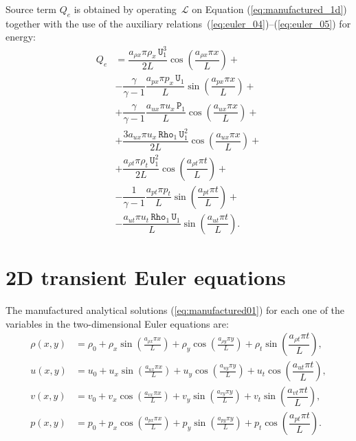\documentclass[10pt]{article}
\newcommand{\Rho}{\,\mathtt{Rho}}
\newcommand{\PP}{\,\mathtt{P}}
\newcommand{\U}{\,\mathtt{U}}
\newcommand{\Lo}{\,\mathcal{L}}
\begin{document}
Source term $Q_e$ is obtained by operating $\Lo$ on Equation  (\ref{eq:manufactured_1d}) together with the use of the  auxiliary relations~(\ref{eq:euler_04})--(\ref{eq:euler_05}) for energy:
  \begin{equation}\label{eq:source_e}
 \begin{split}
Q_e &= \dfrac{a_{\rho x} \pi \rho_x \U_1^3 }{2L}\cos\left(\dfrac{a_{\rho x} \pi x}{L}\right)+\\
&- \dfrac{\gamma}{\gamma-1}\dfrac{a_{px} \pi p_x \U_1}{L}\sin\left(\dfrac{a_{px} \pi x}{L}\right) +\\
&+ \dfrac{\gamma}{\gamma-1}\dfrac{a_{ux} \pi u_x \PP_1}{L}\cos\left(\dfrac{a_{ux} \pi x}{L}\right)  +\\
&+ \dfrac{ 3 a_{ux} \pi u_x \Rho_1 \U_1^2 }{2L}\cos\left(\dfrac{a_{ux} \pi x}{L}\right)+\\
&+   \dfrac{a_{\rho t} \pi \rho_t \U_1^2}{2L}\cos\left(\dfrac{a_{\rho t} \pi t}{L}\right)+\\
&- \dfrac{1}{\gamma-1}\dfrac{a_{pt} \pi p_t}{L}\sin\left(\dfrac{a_{pt} \pi t}{L}\right)+\\
&-\dfrac{ a_{ut} \pi u_t \Rho_1 \U_1}{L}\sin\left(\dfrac{a_{ut} \pi t}{L}\right).
 \end{split}
\end{equation}

 \section{2D transient Euler equations}
The manufactured analytical solutions (\ref{eq:manufactured01}) for each one of the variables in the two-dimensional Euler equations are:
\begin{equation}
\begin{split}
\label{eq:manufactured_2d}
\rho\left(x,y\right) &=  \rho_{0}+ \rho_{x} \sin\left(\frac{a_{ \rho x} \pi x}{L}\right)+ \rho_{y} \cos\left(\frac{a_{ \rho y} \pi y}{L}\right)+ \rho_t \sin\left(\dfrac{a_{\rho t} \pi t}{L}\right),\\
u\left(x,y\right) &= u_{0}+u_{x} \sin\left(\frac{a_{u x} \pi x}{L}\right)+u_{y} \cos\left(\frac{a_{u y} \pi y}{L}\right) + u_t \cos\left(\dfrac{a_{u t} \pi t}{L}\right),\\
v\left(x,y\right) &= v_{0}+v_{x} \cos\left(\frac{a_{v x} \pi x}{L}\right)+v_{y} \sin\left(\frac{a_{v y} \pi y}{L}\right)+ v_t \sin\left(\dfrac{a_{v t} \pi t}{L}\right),\\
p\left(x,y\right) &= p_{0}+p_{x} \cos\left(\frac{a_{p x} \pi x}{L}\right)+p_{y} \sin\left(\frac{a_{p y} \pi y}{L}\right)+ p_t \cos\left(\dfrac{a_{p t} \pi t}{L}\right).\\
\end{split}
\end{equation}
\end{document}
